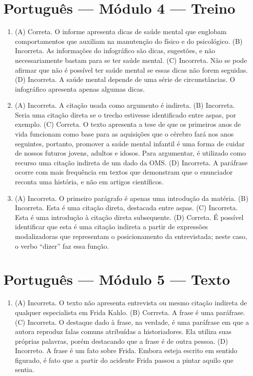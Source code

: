 \section*{Português — Módulo 4 — Treino}

\begin{enumerate}
\item (A) Correta. O informe apresenta dicas de saúde mental que englobam
comportamentos que auxiliam na manutenção do físico e do psicológico.
(B) Incorreta. As informações do infográfico são dicas, sugestões, e não
necessariamente bastam para se ter saúde mental.
(C) Incorreta. Não se pode afirmar que não é possível ter saúde mental se
essas dicas não forem seguidas.
(D) Incorreta. A saúde mental depende de uma série de circunstâncias. O
infográfico apresenta apenas algumas dicas.

\item (A) Incorreta. A citação usada como argumento é indireta.
(B) Incorreta. Seria uma citação direta se o trecho estivesse
identificado entre aspas, por exemplo.
(C) Correta. O texto apresenta a tese de que os primeiros anos de vida
funcionam como base para as aquisições que o cérebro fará nos anos
seguintes, portanto, promover a saúde mental infantil é uma forma de
cuidar de nossos futuros jovens, adultos e idosos. Para argumentar, é
utilizado como recurso uma citação indireta de um dado da OMS.
(D) Incorreta. A paráfrase ocorre com mais frequência em textos que
demonstram que o enunciador reconta uma história, e não em artigos
científicos.

\item (A) Incorreta. O primeiro parágrafo é apenas uma introdução da matéria.
(B) Incorreta. Esta é uma citação direta, destacada entre aspas.
(C) Incorreta. Esta é uma introdução à citação direta subsequente.
(D) Correta. É possível identificar que esta é uma citação indireta a
partir de expressões modalizadoras que representam o posicionamento da
entrevistada; neste caso, o verbo ``dizer'' faz essa função.
\end{enumerate}

\section*{Português — Módulo 5 — Texto}

\begin{enumerate}
\item (A) Incorreta. O texto não apresenta entrevista ou mesmo citação
indireta de qualquer especialista em Frida Kahlo.
(B) Corrreta. A frase é uma paráfrase.
(C) Incorreta. O destaque dado à frase, na verdade, é uma paráfrase em
que a autora reproduz falas comuns atribuídas a historiadores. Ela
utiliza suas próprias palavras, porém destacando que a frase é de outra
pessoa.
(D) Incorreto. A frase é um fato sobre Frida. Embora esteja escrito em
sentido figurado, é fato que a partir do acidente Frida passou a pintar
aquilo que sentia.
\end{enumerate}

